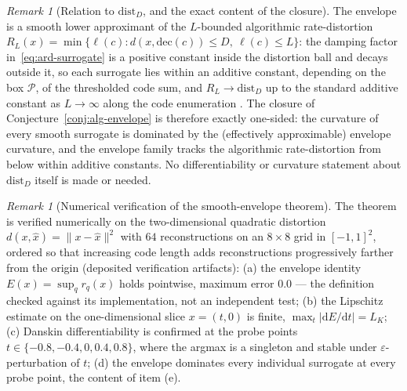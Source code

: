 \documentclass[11pt,a4paper]{article}
\theoremstyle{plain}
\theoremstyle{definition}
\theoremstyle{remark}
\newtheorem{remark}[theorem]{Remark}
\newcommand{\distD}{\mathrm{dist}_{D}}
\begin{document}
\begin{remark}[Relation to $\distD$, and the exact content of the
closure]\label{rem:envelope-distD}
The envelope is a smooth lower approximant of the $L$-bounded
algorithmic rate-distortion $R_L(x) = \min\{\ell(c) : d(x,
\mathrm{dec}(c)) \le D,\ \ell(c) \le L\}$: the damping factor
in~\eqref{eq:ard-surrogate} is a positive constant inside the
distortion ball and decays outside it, so each surrogate lies within
an additive constant, depending on the box $\mathcal{P}$, of the
thresholded code sum, and $R_L \to \distD$ up to the standard
additive constant as $L \to \infty$ along the code enumeration
\citep{vereshchagin2010rate}. The closure of
Conjecture~\ref{conj:alg-envelope} is therefore exactly one-sided:
the curvature of every smooth surrogate is dominated by the
(effectively approximable) envelope curvature, and the envelope
family tracks the algorithmic rate-distortion from below within
additive constants. No differentiability or curvature statement
about $\distD$ itself is made or needed.
\end{remark}

\begin{remark}[Numerical verification of the smooth-envelope
theorem]\label{rem:smooth-envelope-numeric}
The theorem is verified numerically on the two-dimensional quadratic
distortion $d(x, \hat x) = \|x - \hat x\|^2$ with $64$
reconstructions on an $8 \times 8$ grid in $[-1,1]^2$, ordered so
that increasing code length adds reconstructions progressively
farther from the origin (deposited verification artifacts): (a) the
envelope identity $E(x) = \sup_q r_q(x)$ holds pointwise, maximum
error $0.0$ --- the definition checked against its
implementation, not an independent test; (b) the Lipschitz estimate on the one-dimensional slice
$x = (t, 0)$ is finite, $\max_t|\mathrm{d}E/\mathrm{d}t| = L_K$;
(c) Danskin differentiability is confirmed at the probe points
$t \in \{-0.8, -0.4, 0, 0.4, 0.8\}$, where the argmax is a singleton
and stable under $\varepsilon$-perturbation of $t$; (d) the envelope
dominates every individual surrogate at every probe point, the
content of item (e).
\end{remark}
\end{document}
